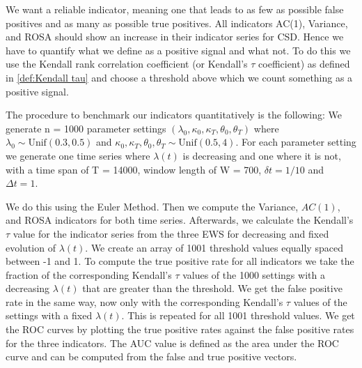 \documentclass[%
thesis=student,%
coverpage=false,%
titlepage=false,%
headmarks=true, %
english,%
font=libertine, %
math=newpxtx, %
BCOR=5mm,%
coverBCOR=11mm%
]{tumbook}
\begin{document}
We want a reliable indicator, meaning one that leads to as few as possible false positives and as many as possible true positives. All indicators AC(1), Variance, and ROSA should show an increase in their indicator series for CSD. Hence we have to quantify what we define as a positive signal and what not. To do this we use the Kendall rank correlation coefficient (or Kendall's $\tau$ coefficient) as defined in \ref{def:Kendall tau} and choose a threshold above which we count something as a positive signal. 



The procedure to benchmark our indicators quantitatively is the following:
We generate n = 1000 parameter settings $(\lambda_{0},\kappa_{0},\kappa_{T},\theta_{0},\theta_{T})$ where $\lambda_{0} \sim \text{Unif}(0.3,0.5)$ and $\kappa_{0},\kappa_{T},\theta_{0},\theta_{T} \sim \text{Unif}(0.5,4)$. For each parameter setting we generate one time series where $\lambda(t)$ is decreasing and one where it is not, with a time span of T = 14000, window length of W = 700, $\delta t = 1/10$ and $\Delta t = 1$.


 We do this using the Euler Method. Then we compute the Variance, $AC(1)$, and ROSA indicators for both time series. Afterwards, we calculate the Kendall's $\tau$ value for the indicator series from the three EWS for decreasing and fixed evolution of $\lambda(t)$. We create an array of 1001 threshold values equally spaced between -1 and 1. To compute the true positive rate for all indicators we take the fraction of the corresponding Kendall's $\tau$ values of the 1000 settings with a decreasing $\lambda(t)$ that are greater than the threshold. We get the false positive rate in the same way, now only with the corresponding Kendall's $\tau$ values of the settings with a fixed $\lambda(t)$. This is repeated for all 1001 threshold values. We get the ROC curves by plotting the true positive rates against the false positive rates for the three indicators.
The AUC value is defined as the area under the ROC curve and can be computed from the false and true positive vectors. 
\end{document}
